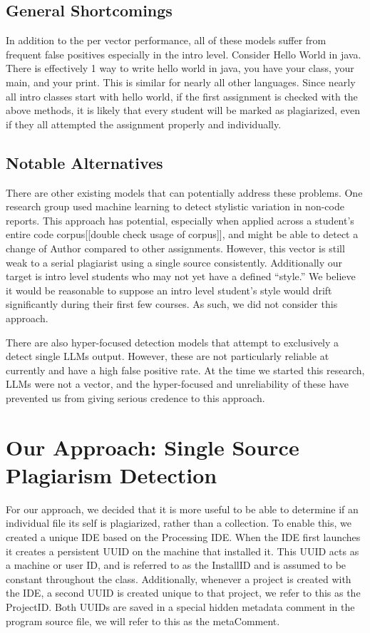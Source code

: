 \documentclass[12pt,final,thesis,actual]{uhthesis}
\newcommand{\n}{\hfill\break}
\newcommand{\installID}{InstallID\xspace}
\newcommand{\projectID}{ProjectID\xspace}
\newcommand{\metaComment}{metaComment\xspace}
\begin{document}
\section{\textbf{General Shortcomings}}
In addition to the per vector performance, all of these models suffer from frequent false positives especially in the intro level.  Consider Hello World in java.  There is effectively 1 way to write hello world in java, you have your class, your main, and your print.  This is similar for nearly all other languages.  Since nearly all intro classes start with hello world, if the first assignment is checked with the above methods, it is likely that every student will be marked as plagiarized, even if they all attempted the assignment properly and individually.

\section{\textbf{Notable Alternatives}}
There are other existing models that can potentially address these problems.  One research group used machine learning to detect stylistic variation in non-code reports. \cite{english}  This approach has potential, especially when applied across a student's entire code corpus[[double check usage of corpus]], and might be able to detect a change of Author compared to other assignments.  However, this vector is still weak to a serial plagiarist using a single source consistently.  Additionally our target is intro level students who may not yet have a defined ``style.''  We believe it would be reasonable to suppose an intro level student's style would drift significantly during their first few courses.  As such, we did not consider this approach.

There are also hyper-focused detection models that attempt to exclusively a detect single LLMs output.\cite{llm detect}  However, these are not particularly reliable at currently\cite{23 percent} and have a high false positive rate. \cite{and you fail}  At the time we started this research, LLMs were not a vector, and the hyper-focused and unreliability of these have prevented us from giving serious credence to this approach. 
\n\chapter{\textbf{Our Approach:} Single Source Plagiarism Detection}
For our approach, we decided that it is more useful to be able to determine if an individual file its self is plagiarized, rather than a collection.  To enable this, we created a unique IDE based on the Processing IDE.  When the IDE first launches it creates a persistent UUID on the machine that installed it.  This UUID acts as a machine or user ID, and is referred to as the \installID and is assumed to be constant throughout the class.  Additionally, whenever a project is created with the IDE, a second UUID is created unique to that project, we refer to this as the \projectID.  Both UUIDs are saved in a special hidden metadata comment in the program source file, we will refer to this as the \metaComment.
\end{document}
